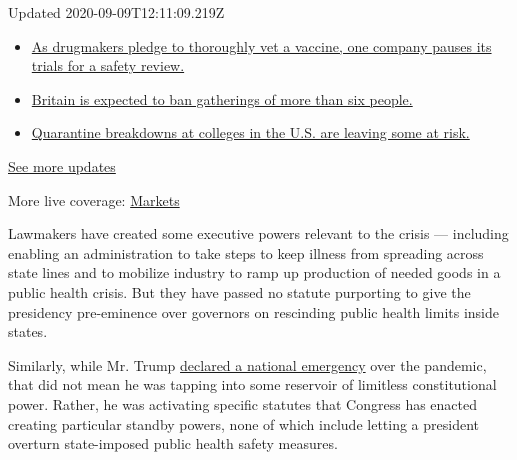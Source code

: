 Updated 2020-09-09T12:11:09.219Z

\begin{itemize}
\tightlist
\item
  \href{https://www.nytimes3xbfgragh.onion/2020/09/09/world/covid-19-coronavirus.html?action=click\&pgtype=Article\&state=default\&region=MAIN_CONTENT_1\&context=storylines_live_updates\#link-70cea8bb}{As
  drugmakers pledge to thoroughly vet a vaccine, one company pauses its
  trials for a safety review.}
\item
  \href{https://www.nytimes3xbfgragh.onion/2020/09/09/world/covid-19-coronavirus.html?action=click\&pgtype=Article\&state=default\&region=MAIN_CONTENT_1\&context=storylines_live_updates\#link-780eaa2f}{Britain
  is expected to ban gatherings of more than six people.}
\item
  \href{https://www.nytimes3xbfgragh.onion/2020/09/09/world/covid-19-coronavirus.html?action=click\&pgtype=Article\&state=default\&region=MAIN_CONTENT_1\&context=storylines_live_updates\#link-11cec4c0}{Quarantine
  breakdowns at colleges in the U.S. are leaving some at risk.}
\end{itemize}

\href{https://www.nytimes3xbfgragh.onion/2020/09/09/world/covid-19-coronavirus.html?action=click\&pgtype=Article\&state=default\&region=MAIN_CONTENT_1\&context=storylines_live_updates}{See
more updates}

More live coverage:
\href{https://www.nytimes3xbfgragh.onion/live/2020/09/09/business/stock-market-today-coronavirus?action=click\&pgtype=Article\&state=default\&region=MAIN_CONTENT_1\&context=storylines_live_updates}{Markets}

Lawmakers have created some executive powers relevant to the crisis ---
including enabling an administration to take steps to keep illness from
spreading across state lines and to mobilize industry to ramp up
production of needed goods in a public health crisis. But they have
passed no statute purporting to give the presidency pre-eminence over
governors on rescinding public health limits inside states.

Similarly, while Mr. Trump
\href{https://www.nytimes3xbfgragh.onion/2020/03/13/us/politics/coronavirus-national-emergency.html}{declared
a national emergency} over the pandemic, that did not mean he was
tapping into some reservoir of limitless constitutional power. Rather,
he was activating specific statutes that Congress has enacted creating
particular standby powers, none of which include letting a president
overturn state-imposed public health safety measures.

